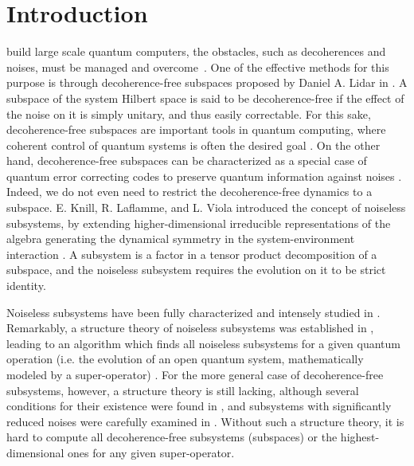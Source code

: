 \documentclass[journal]{IEEEtran}
\begin{document}
\section{Introduction}
 build large scale quantum computers, the obstacles, such as decoherences and noises,  must be managed and overcome~\cite{nielsen2010quantum}. One of the effective methods for this purpose is through
decoherence-free subspaces proposed by Daniel A. Lidar in \cite{lidar1998decoherence}. A subspace of the system Hilbert space is said to be decoherence-free if the effect of the noise on it is simply unitary, and thus easily correctable. For this sake, decoherence-free subspaces are important tools in quantum computing, where coherent control of quantum systems is often the desired goal \cite{lidar2012review}. On the other hand, decoherence-free subspaces  can be characterized as a special case of quantum error correcting codes to preserve quantum information against noises \cite{lidar2012review}. Indeed, we do not even need to restrict the decoherence-free dynamics to a subspace. E. Knill, R. Laflamme, and L. Viola introduced  the concept of noiseless subsystems, by extending higher-dimensional irreducible representations of the algebra generating the dynamical symmetry in the system-environment interaction \cite{knill2000theory}. A subsystem is a factor in a tensor product decomposition of a subspace, and 
the noiseless subsystem requires the evolution on it to be strict identity. 

Noiseless subsystems have been fully characterized and intensely studied in \cite{choi2006method,blume2010information,beny2007generalization,kribs2006quantum,kribs2005unified}. Remarkably, a structure theory of noiseless subsystems  was established in \cite{choi2006method}, leading to an algorithm which finds all noiseless subsystems for a given quantum operation (i.e. the evolution of an open quantum system, mathematically modeled by a super-operator) \cite{knill2006protected,wang2013numerical}. For the more general case of decoherence-free subsystems, however, a structure theory is still lacking, although several conditions for their existence were found in \cite{shabani2005theory}, and subsystems with significantly reduced noises  were carefully examined in \cite{wang2016minimal}. Without such a structure theory, it is hard to compute all decoherence-free subsystems (subspaces) or the highest-dimensional ones for any given super-operator. 
\end{document}
